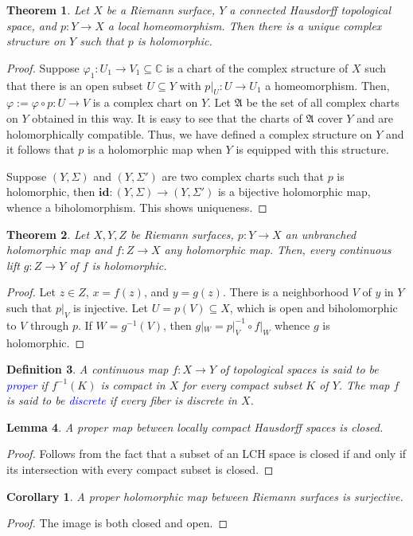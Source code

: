 \documentclass[12pt]{article}
\theoremstyle{thmstyle}
\newtheorem{theorem}{Theorem}[section]
\newtheorem{lemma}[theorem]{Lemma}
\theoremstyle{defstyle}
\newtheorem{definition}[theorem]{Definition}
\newtheorem*{corollary}{Corollary}
\newcommand{\bbC}{\mathbb{C}}
\newcommand{\id}{\mathbf{id}}
\newcommand{\frakA}{\mathfrak{A}}
\newcommand{\define}[1]{\textcolor{blue}{\textit{#1}}}
\begin{document}
\begin{theorem}
    Let $X$ be a Riemann surface, $Y$ a connected Hausdorff topological space, and $p: Y\to X$ a local homeomorphism. Then there is a unique complex structure on $Y$ such that $p$ is holomorphic.
\end{theorem}
\begin{proof}
    Suppose $\varphi_1: U_1\to V_1\subseteq\bbC$ is a chart of the complex structure of $X$ such that there is an open subset $U\subseteq Y$ with $p|_U: U\to U_1$ a homeomorphism. Then, $\varphi:= \varphi\circ p: U\to V$ is a complex chart on $Y$. Let $\frakA$ be the set of all complex charts on $Y$ obtained in this way. It is easy to see that the charts of $\frakA$ cover $Y$ and are holomorphically compatible. Thus, we have defined a complex structure on $Y$ and it follows that $p$ is a holomorphic map when $Y$ is equipped with this structure.  

    Suppose $(Y,\Sigma)$ and $(Y,\Sigma')$ are two complex charts such that $p$ is holomorphic, then $\id: (Y,\Sigma)\to (Y,\Sigma')$ is a bijective holomorphic map, whence a biholomorphism. This shows uniqueness.
\end{proof}

\begin{theorem}
    Let $X,Y,Z$ be Riemann surfaces, $p: Y\to X$ an unbranched holomorphic map and $f: Z\to X$ any holomorphic map. Then, every continuous lift $g: Z\to Y$ of $f$ is holomorphic.
\end{theorem}
\begin{proof}
    Let $z\in Z$, $x = f(z)$, and $y = g(z)$. There is a neighborhood $V$ of $y$ in $Y$ such that $p|_V$ is injective. Let $U = p(V)\subseteq X$, which is open and biholomorphic to $V$ through $p$. If $W = g^{-1}(V)$, then $g|_W = p|_V^{-1}\circ f|_W$ whence $g$ is holomorphic.
\end{proof}

\begin{definition}
    A continuous map $f: X\to Y$ of topological spaces is said to be \define{proper} if $f^{-1}(K)$ is compact in $X$ for every compact subset $K$ of $Y$. The map $f$ is said to be \define{discrete} if every fiber is discrete in $X$.
\end{definition}

\begin{lemma}
    A proper map between locally compact Hausdorff spaces is closed.
\end{lemma}
\begin{proof}
    Follows from the fact that a subset of an LCH space is closed if and only if its intersection with every compact subset is closed.
\end{proof}
\begin{corollary}
    A proper holomorphic map between Riemann surfaces is surjective.
\end{corollary}
\begin{proof}
    The image is both closed and open.
\end{proof}
\end{document}
